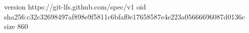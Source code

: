 version https://git-lfs.github.com/spec/v1
oid sha256:c32c32698497af898e9f5811c6bfaf0e17658587e4e223a05666696087d0136c
size 860
